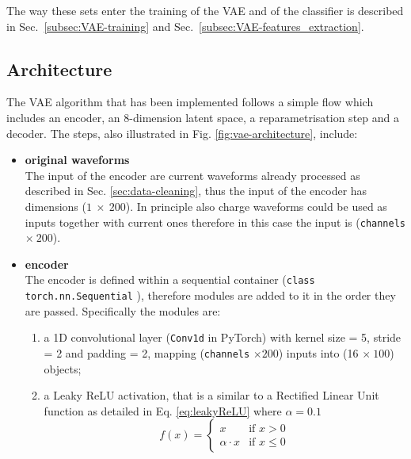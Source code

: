 The way these sets enter the training of the \ac{VAE} and of the classifier is described in Sec.~\ref{subsec:VAE-training} and Sec.~\ref{subsec:VAE-features_extraction}.

\subsection{Architecture}
\label{sec:vae-architeture}
The \ac{VAE} algorithm that has been implemented follows a simple flow which includes an encoder, an 8-dimension latent space, a reparametrisation step and a decoder. The steps, also illustrated in Fig. \ref{fig:vae-architecture}, include: 
\begin{itemize}
    \item \textbf{original waveforms}\\
    The input of the encoder are current waveforms already processed as described in Sec. \ref{sec:data-cleaning}, thus the input of the encoder has dimensions ($1~\times~200$).
    In principle also charge waveforms could be used as inputs together with current ones therefore in this case the input is (\texttt{channels} $\times~200$).
    \item \textbf{encoder}\\
    The encoder is defined within a sequential container (\texttt{class torch.nn.Sequential} \cite{torchSequential}), therefore modules are added to it in the order they are passed. Specifically the modules are:
    \begin{enumerate}
        \item a 1D convolutional layer (\texttt{Conv1d} in PyTorch) with kernel size = 5, stride = 2 and padding = 2, mapping (\texttt{channels} $\times 200$) inputs into (16 $\times~100$) objects;
        \item a Leaky ReLU activation, that is a similar to a Rectified Linear Unit function as detailed in Eq. \ref{eq:leakyReLU} where $\alpha = 0.1$
        \begin{equation}
            \label{eq:leakyReLU}
            f(x) = 
            \begin{cases} 
                x & \text{if } x > 0 \\
                \alpha \cdot x & \text{if } x \le 0 
            \end{cases}

\end{equation}
\end{enumerate}
\end{itemize}
